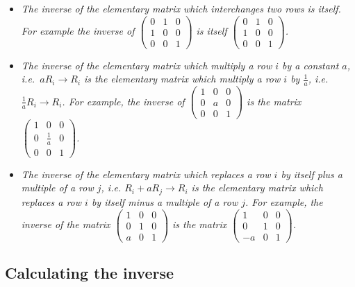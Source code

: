 \documentclass[
  letterpaper,
  DIV=11,
  numbers=noendperiod]{scrartcl}
\theoremstyle{remark}
\begin{document}
\begin{itemize}
\item
  \emph{The inverse of the elementary matrix which interchanges two rows
  is itself. For example the inverse of
  \(\left(\begin{array}{ccc}0 & 1 & 0\\ 1 & 0 & 0 \\ 0 & 0 & 1\end{array}\right)\)
  is itself
  \(\left(\begin{array}{ccc}0 & 1 & 0\\ 1 & 0 & 0 \\ 0 & 0 & 1\end{array}\right)\).}
\item
  \emph{The inverse of the elementary matrix which multiply a row \(i\)
  by a constant \(a\), i.e.~\(aR_{i}\rightarrow R_{i}\) is the
  elementary matrix which multiply a row \(i\) by \(\frac{1}{a}\), i.e.
  \(\frac{1}{a}R_{i}\rightarrow R_{i}\). For example, the inverse of
  \(\left(\begin{array}{ccc}1 & 0 & 0\\ 0 & a & 0 \\ 0 & 0 & 1\end{array}\right)\)
  is the matrix
  \(\left(\begin{array}{ccc}1 & 0 & 0\\ 0 & \frac{1}{a} & 0 \\ 0 & 0 & 1\end{array}\right)\).}
\item
  \emph{The inverse of the elementary matrix which replaces a row \(i\)
  by itself plus a multiple of a row \(j\), i.e.
  \(R_{i}+aR_{j}\rightarrow R_{i}\) is the elementary matrix which
  replaces a row \(i\) by itself minus a multiple of a row \(j\). For
  example, the inverse of the matrix
  \(\left(\begin{array}{ccc}1 & 0 & 0\\ 0 & 1 & 0 \\ a & 0 & 1\end{array}\right)\)
  is the matrix
  \(\left(\begin{array}{ccc}1 & 0 & 0\\ 0 & 1 & 0 \\ -a & 0 & 1\end{array}\right)\).}
\end{itemize}

\subsection{Calculating the inverse}\label{calculating-the-inverse}
\end{document}
